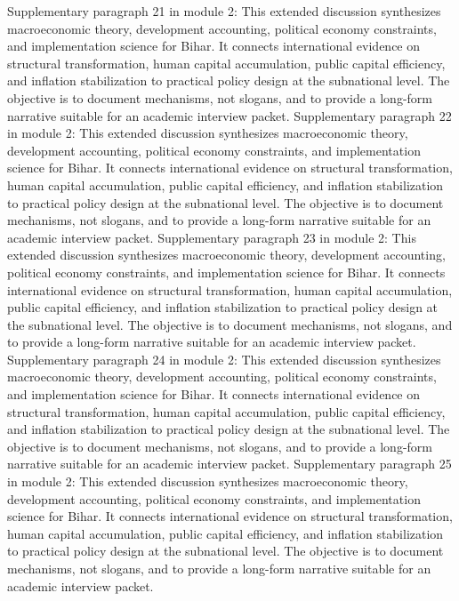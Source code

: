 \documentclass[preprint,12pt]{elsarticle}
\begin{document}
Supplementary paragraph 21 in module 2: This extended discussion synthesizes macroeconomic theory, development accounting, political economy constraints, and implementation science for Bihar. It connects international evidence on structural transformation, human capital accumulation, public capital efficiency, and inflation stabilization to practical policy design at the subnational level. The objective is to document mechanisms, not slogans, and to provide a long-form narrative suitable for an academic interview packet.
Supplementary paragraph 22 in module 2: This extended discussion synthesizes macroeconomic theory, development accounting, political economy constraints, and implementation science for Bihar. It connects international evidence on structural transformation, human capital accumulation, public capital efficiency, and inflation stabilization to practical policy design at the subnational level. The objective is to document mechanisms, not slogans, and to provide a long-form narrative suitable for an academic interview packet.
Supplementary paragraph 23 in module 2: This extended discussion synthesizes macroeconomic theory, development accounting, political economy constraints, and implementation science for Bihar. It connects international evidence on structural transformation, human capital accumulation, public capital efficiency, and inflation stabilization to practical policy design at the subnational level. The objective is to document mechanisms, not slogans, and to provide a long-form narrative suitable for an academic interview packet.
Supplementary paragraph 24 in module 2: This extended discussion synthesizes macroeconomic theory, development accounting, political economy constraints, and implementation science for Bihar. It connects international evidence on structural transformation, human capital accumulation, public capital efficiency, and inflation stabilization to practical policy design at the subnational level. The objective is to document mechanisms, not slogans, and to provide a long-form narrative suitable for an academic interview packet.
Supplementary paragraph 25 in module 2: This extended discussion synthesizes macroeconomic theory, development accounting, political economy constraints, and implementation science for Bihar. It connects international evidence on structural transformation, human capital accumulation, public capital efficiency, and inflation stabilization to practical policy design at the subnational level. The objective is to document mechanisms, not slogans, and to provide a long-form narrative suitable for an academic interview packet.
\end{document}
